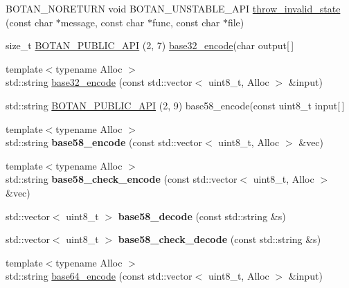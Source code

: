 \begin{DoxyCompactItemize}
\item 
B\+O\+T\+A\+N\+\_\+\+N\+O\+R\+E\+T\+U\+RN void B\+O\+T\+A\+N\+\_\+\+U\+N\+S\+T\+A\+B\+L\+E\+\_\+\+A\+PI \hyperlink{namespace_botan_a250ba8106fea7c03f69342277f3065e6}{throw\+\_\+invalid\+\_\+state} (const char $\ast$message, const char $\ast$func, const char $\ast$file)
\item 
size\+\_\+t \hyperlink{namespace_botan_ad87a88225cfb55247f4a91b0b50da678}{B\+O\+T\+A\+N\+\_\+\+P\+U\+B\+L\+I\+C\+\_\+\+A\+PI} (2, 7) \hyperlink{namespace_botan_a72149230362af50f830a4ee04d7a9786}{base32\+\_\+encode}(char output\mbox{[}$\,$\mbox{]}
\item 
{\footnotesize template$<$typename Alloc $>$ }\\std\+::string \hyperlink{namespace_botan_a72149230362af50f830a4ee04d7a9786}{base32\+\_\+encode} (const std\+::vector$<$ uint8\+\_\+t, Alloc $>$ \&input)
\item 
std\+::string \hyperlink{namespace_botan_adaff7a38fe7256124b099ad5b61c3fd5}{B\+O\+T\+A\+N\+\_\+\+P\+U\+B\+L\+I\+C\+\_\+\+A\+PI} (2, 9) base58\+\_\+encode(const uint8\+\_\+t input\mbox{[}$\,$\mbox{]}
\item 
\mbox{\label{namespace_botan_a3ccb6de278db39ed195c8abb39b44b10}} 
{\footnotesize template$<$typename Alloc $>$ }\\std\+::string {\bfseries base58\+\_\+encode} (const std\+::vector$<$ uint8\+\_\+t, Alloc $>$ \&vec)
\item 
\mbox{\label{namespace_botan_a14e6ce2ca34d3a10863f4c9b85374046}} 
{\footnotesize template$<$typename Alloc $>$ }\\std\+::string {\bfseries base58\+\_\+check\+\_\+encode} (const std\+::vector$<$ uint8\+\_\+t, Alloc $>$ \&vec)
\item 
\mbox{\label{namespace_botan_aab2db1a9db277786d25cbce990c636d5}} 
std\+::vector$<$ uint8\+\_\+t $>$ {\bfseries base58\+\_\+decode} (const std\+::string \&s)
\item 
\mbox{\label{namespace_botan_ac007298f54e6d39e8feb822ec6d84998}} 
std\+::vector$<$ uint8\+\_\+t $>$ {\bfseries base58\+\_\+check\+\_\+decode} (const std\+::string \&s)
\item 
{\footnotesize template$<$typename Alloc $>$ }\\std\+::string \hyperlink{namespace_botan_ae612d0f1287d36555adbe7ed4d8f171f}{base64\+\_\+encode} (const std\+::vector$<$ uint8\+\_\+t, Alloc $>$ \&input)

\end{DoxyCompactItemize}
